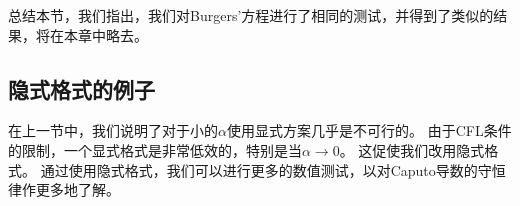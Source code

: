 总结本节，我们指出，我们对Burgers'方程进行了相同的测试，并得到了类似的结果，将在本章中略去。
%
%

\subsection{隐式格式的例子}
在上一节中，我们说明了对于小的$ \alpha $使用显式方案几乎是不可行的。 由于CFL条件的限制，一个显式格式是非常低效的，特别是当$ \alpha \rightarrow 0 $。 这促使我们改用隐式格式。 通过使用隐式格式，我们可以进行更多的数值测试，以对Caputo导数的守恒律作更多地了解。

